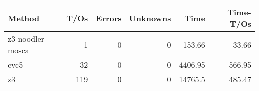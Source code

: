 \begin{tabular}{lrrrrr}
\hline
 Method           &   T/Os &   Errors &   Unknowns &     Time &   Time-T/Os \\
\hline
 z3-noodler-mosca &      1 &        0 &          0 &   153.66 &       33.66 \\
 cvc5             &     32 &        0 &          0 &  4406.95 &      566.95 \\
 z3               &    119 &        0 &          0 & 14765.5  &      485.47 \\
\hline
\end{tabular}
